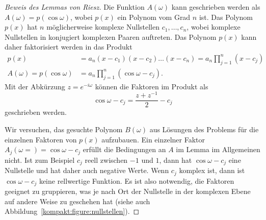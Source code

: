 \begin{proof}[Beweis des Lemmas von Riesz]
Die Funktion $A(\omega)$ kann geschrieben werden als
$A(\omega) = p(\cos\omega)$, wobei $p(x)$ ein Polynom vom
Grad $n$ ist.
Das Polynom $p(x)$ hat $n$ möglicherweise komplexe Nullstellen
$c_1,\dots,c_n$, wobei komplexe Nullstellen in konjugiert komplexen
Paaren auftreten.
Das Polynom $p(x)$ kann daher faktorisiert werden in das Produkt
\begin{align*}
p(x)
&=
a_n(x-c_1)(x-c_2)\dots(x-c_n)
=
a_n \prod_{j=1}^n (x-c_j)
\\
A(\omega) = p(\cos\omega)
&=
a_n \prod_{j=1}^n (\cos \omega - c_j).
\end{align*}
Mit der Abkürzung $z=e^{-i\omega}$ können die Faktoren im Produkt als
\[
\cos\omega -c_j = \frac{z+z^{-1}}2-c_j
\]
geschrieben werden.

Wir versuchen, das gesuchte Polynom $B(\omega)$ aus Lösungen des Problems
für die einzelnen Faktoren von $p(x)$ aufzubauen.
Ein einzelner Faktor $A_j(\omega=)=\cos\omega - c_j$ erfüllt die Bedingungen an
$A$ im Lemma im Allgemeinen nicht.
Ist zum Beispiel $c_j$ reell zwischen $-1$ und $1$, dann hat
$\cos\omega-c_j$ eine Nullstelle und hat daher auch negative Werte.
Wenn $c_j$ komplex ist, dann ist $\cos\omega-c_j$ keine rellwertige
Funktion.
Es ist also notwendig, die Faktoren geeignet zu gruppieren,
was je nach Ort der Nullstelle in der komplexen Ebene auf andere
Weise zu geschehen hat (siehe auch Abbildung~\ref{kompakt:figure:nullstellen}).


\end{proof}
